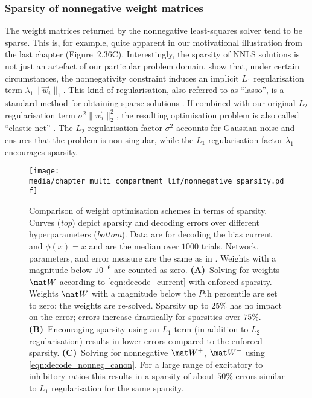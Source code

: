 \pagebreak

\subsubsection{Sparsity of nonnegative weight matrices}
The weight matrices returned by the nonnegative least-squares solver tend to be sparse.
This is, for example, quite apparent in our motivational illustration from the last chapter (Figure~2.36C).
Interestingly, the sparsity of NNLS solutions is not just an artefact of our particular problem domain.
 show that, under certain circumstances, the nonnegativity constraint induces an implicit $L_1$ regularisation term $\lambda_1 \|\vec w_i\|_1$.
This kind of regularisation, also referred to as \enquote{lasso}, is a standard method for obtaining sparse solutions \citep[Section~3.1.4]{bishop2006pattern}.
If combined with our original $L_2$ regularisation term $\sigma^2 \| \vec w_i \|_2^2$, the resulting optimisation problem is also called \enquote{elastic net} \citep{zou2005regularization}.
The $L_2$ regularisation factor $\sigma^2$ accounts for Gaussian noise and ensures that the problem is non-singular, while the $L_1$ regularisation factor $\lambda_1$ encourages sparsity.

\begin{figure}
	\texttt{[image: media/chapter\_multi\_compartment\_lif/nonnegative\_sparsity.pdf]}%
	{\label{fig:nonnegative_sparsity_a}}%
	{\label{fig:nonnegative_sparsity_b}}%
	{\label{fig:nonnegative_sparsity_c}}%
	\caption[Comparison of weight optimisation schemes in terms of sparsity]{Comparison of weight optimisation schemes in terms of sparsity.
	Curves (\emph{top}) depict sparsity and decoding errors over different hyperparameters (\emph{bottom}).
	Data are for decoding the bias current and $\phi(x) = x$ and are the median over $1000$ trials.
	Network, parameters, and error measure are the same as in .
	Weights with a magnitude below $10^{-6}$ are counted as zero.
	\textbf{(A)}~Solving for weights $\mat W$ according to \cref{eqn:decode_current} with enforced sparsity.
	Weights $\mat W$ with a magnitude below the $P$th percentile are set to zero; the weights are re-solved.
	Sparsity up to $25\%$ has no impact on the error; errors increase drastically for sparsities over $75\%$.
	\textbf{(B)}~Encouraging sparsity using an $L_1$ term (in addition to $L_2$ regularisation) results in lower errors compared to the enforced sparsity.
	\textbf{(C)}~Solving for nonnegative $\mat W^+$, $\mat W^-$ using \cref{eqn:decode_nonneg_canon}.
	For a large range of excitatory to inhibitory ratios this results in a sparsity of about $50\%$ errors similar to $L_1$ regularisation for the same sparsity.
	}
	\label{fig:nonnegative_sparsity}
\end{figure}

